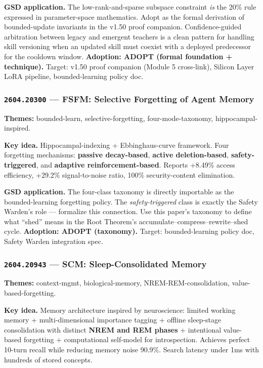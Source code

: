 \documentclass[11pt,letterpaper]{article}
\newcommand{\arxivid}[1]{\texttt{\textcolor{accent}{#1}}}
\newcommand{\paperhead}[2]{\noindent\textbf{\sffamily\textcolor{secondary}{#1}} \textemdash{} #2}
\begin{document}
\textbf{GSD application.} The low-rank-and-sparse subspace constraint \textit{is} the 20\% rule expressed in parameter-space mathematics. Adopt as the formal derivation of bounded-update invariants in the v1.50 proof companion. Confidence-guided arbitration between legacy and emergent teachers is a clean pattern for handling skill versioning when an updated skill must coexist with a deployed predecessor for the cooldown window. \textbf{Adoption: ADOPT (formal foundation + technique).} Target: v1.50 proof companion (Module 5 cross-link), Silicon Layer LoRA pipeline, bounded-learning policy doc.

\subsubsection{\arxivid{2604.20300} --- FSFM: Selective Forgetting of Agent Memory}

\paperhead{Themes:}{bounded-learn, selective-forgetting, four-mode-taxonomy, hippocampal-inspired.}

\textbf{Key idea.} Hippocampal-indexing + Ebbinghaus-curve framework. Four forgetting mechanisms: \textbf{passive decay-based}, \textbf{active deletion-based}, \textbf{safety-triggered}, and \textbf{adaptive reinforcement-based}. Reports +8.49\% access efficiency, +29.2\% signal-to-noise ratio, 100\% security-content elimination.

\textbf{GSD application.} The four-class taxonomy is directly importable as the bounded-learning forgetting policy. The \textit{safety-triggered} class is exactly the Safety Warden's role --- formalize this connection. Use this paper's taxonomy to define what ``shed'' means in the Root Theorem's accumulate--compress--rewrite--shed cycle. \textbf{Adoption: ADOPT (taxonomy).} Target: bounded-learning policy doc, Safety Warden integration spec.

\subsubsection{\arxivid{2604.20943} --- SCM: Sleep-Consolidated Memory}

\paperhead{Themes:}{context-mgmt, biological-memory, NREM-REM-consolidation, value-based-forgetting.}

\textbf{Key idea.} Memory architecture inspired by neuroscience: limited working memory + multi-dimensional importance tagging + offline sleep-stage consolidation with distinct \textbf{NREM and REM phases} + intentional value-based forgetting + computational self-model for introspection. Achieves perfect 10-turn recall while reducing memory noise 90.9\%. Search latency under 1ms with hundreds of stored concepts.
\end{document}
